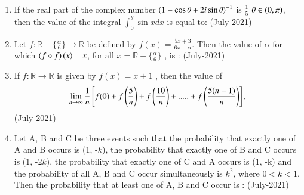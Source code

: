 \documentclass[journal]{IEEEtran}
\begin{document}
\begin{enumerate}
\begin{enumerate}
    \end{enumerate}
    \item  If the real part of the complex number $\left(1 - \cos \theta + 2i \sin\theta\right)^{-1}$
  is $\frac{1}{5}$ $ \theta \in \left(0 , \pi\right)$, then the value of the integral $\int_{0}^{\theta} \sin xdx$ is equal to: \hfill (July-2021)
  \begin{enumerate}
  \end{enumerate}
  \item Let $f : \mathbb{R} - \{ \frac{\alpha}{6} \} \to \mathbb{R}$ be defined by 
 $f(x) = \frac{5x + 3}{6x - \alpha}.$ Then the value of $\alpha$
 for which $\left(f\circ f\right)\left(x\right) = x$, for all $x = \mathbb{R} - \{ \frac{\alpha}{6} \}$
, is : \hfill (July-2021)
\begin{enumerate}
\end{enumerate}
    \item If $f : \mathbb{R} \to \mathbb{R}$ is given by $f(x) = x + 1$
, then the value of  \[\lim_{n\to\infty} \frac{1}{n} {}\left[f(0) + f\left(\frac{5}{n}\right) + f \left(\frac{10}{n}\right) + ..... + f\left(\frac{5(n - 1)}{n}\right)\right],\] \hfill (July-2021)
\begin{enumerate}
\end{enumerate}
    \item Let A, B and C be three events such that the probability that exactly one of A and B occurs is (1, 
 -$k$), the probability that exactly one of B and C occurs is (1, -2$k$), the probability that exactly one of C and A occurs is (1, -k) and the probability of all A, B and C occur simultaneously is $k^2$, where $0 < k < 1$. Then the probability that at least one of A, B and C occur is : \hfill (July-2021)

\end{enumerate}
\end{document}
